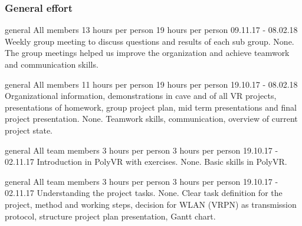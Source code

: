 \subsubsection{General effort}
	{general}%
	{All members}%
	{13 hours per person}%
	{19 hours per person}%
	{09.11.17 - 08.02.18}%
	{Weekly group meeting to discuss questions and results of each sub group.}%
	{None.}%
	{The group meetings helped us improve the organization and achieve teamwork and communication skills.}%
	
	{general}%
	{All members}%
	{11 hours per person}%
	{19 hours per person}%
	{19.10.17 - 08.02.18}%
	{Organizational information, demonstrations in cave and of all VR projects, presentations of homework, group project plan, mid term presentations and final project presentation.}%
	{None.}%
	{Teamwork skills, communication, overview of current project state.}%
	
	{general}%
	{All team members}%
	{3 hours per person}%
	{3 hours per person}%
	{19.10.17 - 02.11.17}%
	{Introduction in PolyVR with exercises.}%
	{None.}%
	{Basic skills in PolyVR.}%
	
	{general}%
	{All team members}%
	{3 hours per person}%
	{3 hours per person}%
	{19.10.17 - 02.11.17}%
	{Understanding the project tasks.}%
	{None.}%
	{Clear task definition for the project, method and working steps, decision for WLAN (VRPN) as transmission protocol, structure project plan presentation, Gantt chart. }%
	
